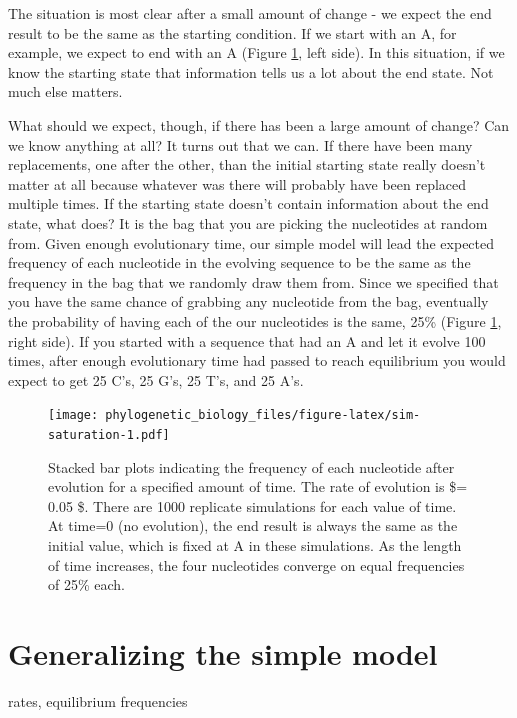 \documentclass[
]{book}
\begin{document}
The situation is most clear after a small amount of change - we expect the end result to be the same as the starting condition. If we start with an A, for example, we expect to end with an A (Figure \ref{fig:sim-saturation}, left side). In this situation, if we know the starting state that information tells us a lot about the end state. Not much else matters.

What should we expect, though, if there has been a large amount of change? Can we know anything at all? It turns out that we can. If there have been many replacements, one after the other, than the initial starting state really doesn't matter at all because whatever was there will probably have been replaced multiple times. If the starting state doesn't contain information about the end state, what does? It is the bag that you are picking the nucleotides at random from. Given enough evolutionary time, our simple model will lead the expected frequency of each nucleotide in the evolving sequence to be the same as the frequency in the bag that we randomly draw them from. Since we specified that you have the same chance of grabbing any nucleotide from the bag, eventually the probability of having each of the our nucleotides is the same, 25\% (Figure \ref{fig:sim-saturation}, right side). If you started with a sequence that had an A and let it evolve 100 times, after enough evolutionary time had passed to reach equilibrium you would expect to get 25 C's, 25 G's, 25 T's, and 25 A's.

\begin{figure}
\centering
\texttt{[image: phylogenetic\_biology\_files/figure-latex/sim-saturation-1.pdf]}
\caption{\label{fig:sim-saturation}Stacked bar plots indicating the frequency of each nucleotide after evolution for a specified amount of time. The rate of evolution is \$\mu= 0.05 \$. There are 1000 replicate simulations for each value of time. At time=0 (no evolution), the end result is always the same as the initial value, which is fixed at A in these simulations. As the length of time increases, the four nucleotides converge on equal frequencies of 25\% each.}
\end{figure}

\hypertarget{generalizing-the-simple-model}{%
\section{Generalizing the simple model}\label{generalizing-the-simple-model}}

rates, equilibrium frequencies
\end{document}

